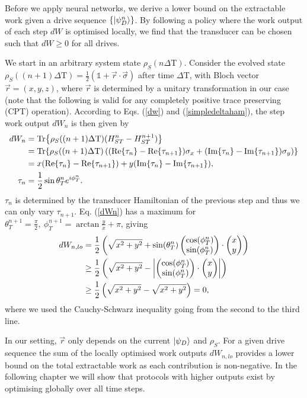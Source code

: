 Before we apply neural networks, we derive a lower bound on the extractable work given a drive sequence $\{\ket{\psi_D^n}\}$.
By following a policy where the work output of each step $dW$ is optimised locally, we find that the transducer can be chosen such that $dW \geq 0$ for all drives.

We start in an arbitrary system state $\rho_S(n \Delta \mathrm{T})$.
Consider the evolved state $\rho_S((n+1) \Delta \mathrm{T}) =\frac{1}{2} (\mathds{1} + \vec{r} \cdot \vec{\sigma})$ after time $\Delta \mathrm{T}$, with Bloch vector $\vec{r} = ( x, y, z )$, where $\vec{r}$ is determined by a unitary transformation in our case (note that the following is valid for any completely positive trace preserving (CPT) operation). According to Eqs. (\ref{dw}) and (\ref{simpledeltaham}), the step work output $dW_n$ is then given by
\begin{align} \label{dWn}
dW_n &= \Tr{\rho_S((n+1) \Delta \mathrm{T}) (H_{ST}^{n} - H_{ST}^{n+1})} \nonumber \\
&= \Tr{\rho_S((n+1) \Delta \mathrm{T}) \left((\Re{\tau_n} - \Re{\tau_{n+1}}) \sigma_x + (\Im{\tau_n} - \Im{\tau_{n+1}} ) \sigma_y \right)} \nonumber \\
&= x (\Re{\tau_n} - \Re{\tau_{n+1}}) + y (\Im{\tau_n} - \Im{\tau_{n+1}}), \\
\tau_n &= \frac{1}{2} \sin{\theta_T^n} e^{i\phi_T^n}. \nonumber
\end{align}
$\tau_n$ is determined by the transducer Hamiltonian of the previous step and thus we can only vary $\tau_{n+1}$.
Eq. (\ref{dWn}) has a maximum for $\theta_T^{n+1} = \frac{\pi}{2}, \ \phi_T^{n+1} = \arctan{\frac{y}{x}} + \pi$, giving
\begin{align*}
dW_{n, lo} &= \frac{1}{2}\left(\sqrt{x^2 + y^2} + \sin(\theta^n_T) \begin{pmatrix} \cos(\phi^n_T) \\ \sin(\phi^n_T) \end{pmatrix} \cdot \begin{pmatrix} x \\ y \end{pmatrix} \right) \\
 &\geq \frac{1}{2}\left(\sqrt{x^2 + y^2} - \abs{ \begin{pmatrix} \cos(\phi^n_T) \\ \sin(\phi^n_T) \end{pmatrix} \cdot \begin{pmatrix} x \\ y \end{pmatrix}} \right) \\
 &\geq \frac{1}{2}\left(\sqrt{x^2 + y^2} - \sqrt{x^2 + y^2} \right) = 0,
\end{align*}
where we used the Cauchy-Schwarz inequality going from the second to the third line.

In our setting, $\vec{r}$ only depends on the current $\ket{\psi_D}$ and $\rho_S$.
For a given drive sequence the sum of the locally optimised work outputs $dW_{n, lo}$ provides a lower bound on the total extractable work as each contribution is non-negative. In the following chapter we will show that protocols with higher outputs exist by optimising globally over all time steps.